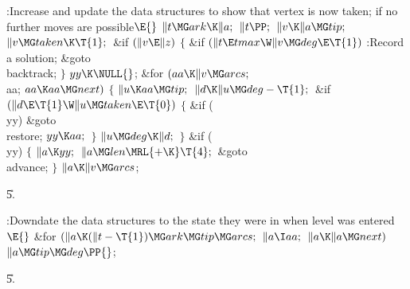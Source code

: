 \B{}:Increase  and update the data structures to show that vertex
 is now taken;  if no further moves are
possible\X${}\E{}$\6
$\|t\MG\\{ark}\K\|a;{}$\6
${}\|t\PP;{}$\6
${}\|v\K\|a\MG\\{tip};{}$\6
${}\|v\MG\\{taken}\K\T{1};{}$\6
\&{if} ${}(\|v\E\|z){}$\5
${}\{{}$\1\6
\&{if} ${}(\|t\E\\{tmax}\W\|v\MG\\{deg}\E\T{1}){}$\1\5
:Record a solution\X;\2\6
\&{goto} \\{backtrack};\6
\4${}\}{}$\2\6
${}\\{yy}\K\NULL{}$;\6
\&{for} ${}(\\{aa}\K\|v\MG\\{arcs};{}$ \\{aa}; ${}\\{aa}\K\\{aa}\MG\\{next}){}$%
\5
${}\{{}$\1\6
${}\|u\K\\{aa}\MG\\{tip};{}$\6
${}\|d\K\|u\MG\\{deg}-\T{1};{}$\6
\&{if} ${}(\|d\E\T{1}\W\|u\MG\\{taken}\E\T{0}){}$\5
${}\{{}$\1\6
\&{if} (\\{yy})\1\5
\&{goto} \\{restore};\2\6
${}\\{yy}\K\\{aa};{}$\6
\4${}\}{}$\2\6
${}\|u\MG\\{deg}\K\|d;{}$\6
\4${}\}{}$\2\6
\&{if} (\\{yy})\5
${}\{{}$\1\6
${}\|a\K\\{yy};{}$\6
${}\|a\MG\\{len}\MRL{+{\K}}\T{4};{}$\6
\&{goto} \\{advance};\6
\4${}\}{}$\2\6
${}\|a\K\|v\MG\\{arcs}{}$;\par
\U5.\fi

\B{}:Downdate the data structures to the state they were in when level %
 was entered\X${}\E{}$\6
\&{for} ${}(\|a\K(\|t-\T{1})\MG\\{ark}\MG\\{tip}\MG\\{arcs};{}$ ${}\|a\I%
\\{aa};{}$ ${}\|a\K\|a\MG\\{next}){}$\1\5
${}\|a\MG\\{tip}\MG\\{deg}\PP{}$;\2\par
\U5.\fi

